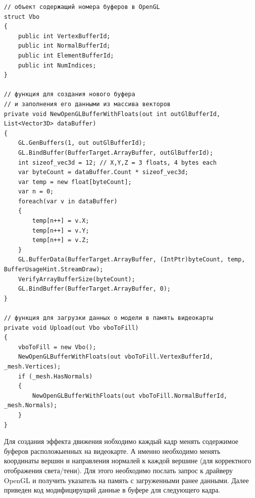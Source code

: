\begin{verbatim}
// объект содержащий номера буферов в OpenGL
struct Vbo
{
    public int VertexBufferId;
    public int NormalBufferId;
    public int ElementBufferId;
    public int NumIndices;
}

// функция для создания нового буфера 
// и заполнения его данными из массива векторов
private void NewOpenGLBufferWithFloats(out int outGlBufferId, List<Vector3D> dataBuffer) 
{
    GL.GenBuffers(1, out outGlBufferId);
    GL.BindBuffer(BufferTarget.ArrayBuffer, outGlBufferId);
    int sizeof_vec3d = 12; // X,Y,Z = 3 floats, 4 bytes each
    var byteCount = dataBuffer.Count * sizeof_vec3d;
    var temp = new float[byteCount];
    var n = 0;
    foreach(var v in dataBuffer)
    {
        temp[n++] = v.X;
        temp[n++] = v.Y;
        temp[n++] = v.Z;
    }
    GL.BufferData(BufferTarget.ArrayBuffer, (IntPtr)byteCount, temp, BufferUsageHint.StreamDraw);
    VerifyArrayBufferSize(byteCount);
    GL.BindBuffer(BufferTarget.ArrayBuffer, 0);
}

// функция для загрузки данных о модели в память видеокарты
private void Upload(out Vbo vboToFill)
{
    vboToFill = new Vbo();    
    NewOpenGLBufferWithFloats(out vboToFill.VertexBufferId, _mesh.Vertices);
    if (_mesh.HasNormals)
    {
        NewOpenGLBufferWithFloats(out vboToFill.NormalBufferId, _mesh.Normals);
    }
}

\end{verbatim}

Для создания эффекта движения нобходимо каждый кадр менять содержимое буферов расположыенных на видеокарте.
А именно необходимо менять координаты вершин и направления нормалей к каждой вершине (для корректного отображения света/тени).
Для этого необходимо послать запрос к драйверу OpenGL и получить указатель на память с загруженными ранее данными.
Далее приведен код модифицирущий данные в буфере для следующего кадра.

